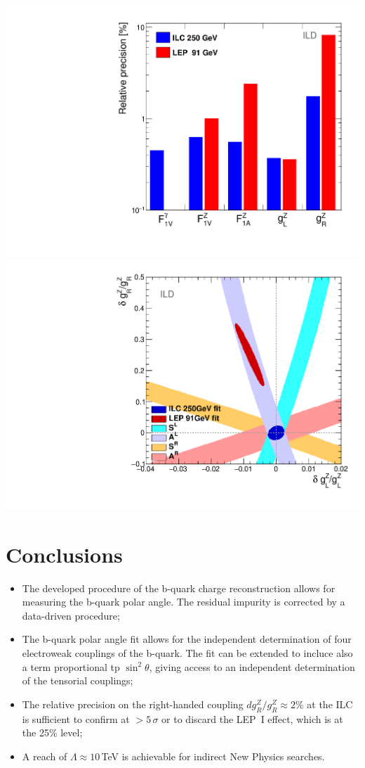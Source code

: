 \begin{center}
	\includegraphics[width=0.4\linewidth]{plots/final-graph-ild.pdf}
	\includegraphics[width=0.4\linewidth]{plots/ilc-precision-ild.pdf}
		\label{fig:LEPILCResult_3}
\end{center}\vspace{0.5cm}


\color{Blue} %

\section*{Conclusions}

\begin{itemize}
\item The developed procedure of the b-quark charge reconstruction allows for measuring the b-quark polar angle. The residual impurity is corrected by a data-driven procedure;
\item The b-quark polar angle fit allows for the independent determination of four electroweak couplings of the b-quark. The fit can be extended to incluce also a term proportional tp $\sin^2\theta$, giving access to an independent determination of the tensorial couplings;
\item  The relative precision on the right-handed coupling $dg^Z_R/g^Z_R\approx 2$\% at the ILC is sufficient to confirm at $>5\,\sigma$ or to discard the LEP~I effect, which is at the 25\% level;
\item A reach of $\Lambda \approx 10$\,TeV is achievable for indirect New Physics searches.
\end{itemize}

